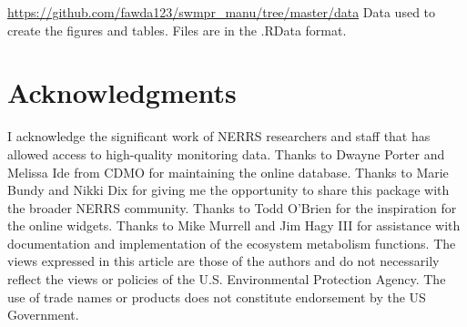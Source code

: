 \documentclass[10pt,letterpaper]{article}\usepackage[]{graphicx}\usepackage[]{color}
\begin{document}
\href{https://github.com/fawda123/swmpr_manu/tree/master/data}{https://github.com/fawda123/swmpr\_manu/tree/master/data} Data used to create the figures and tables.  Files are in the .RData format.

\section*{Acknowledgments}

I acknowledge the significant work of \gls{NERRS} researchers and staff that has allowed access to high-quality monitoring data.  Thanks to Dwayne Porter and Melissa Ide from \gls{CDMO} for maintaining the online database.  Thanks to Marie Bundy and Nikki Dix for giving me the opportunity to share this package with the broader \gls{NERRS} community.  Thanks to Todd O'Brien for the inspiration for the online widgets. Thanks to Mike Murrell and Jim Hagy III for assistance with documentation and implementation of the ecosystem metabolism functions. The views expressed in this article are those of the authors and do not necessarily reflect the views or policies of the U.S. Environmental Protection Agency.  The use of trade names or products does not constitute endorsement by the US Government.   

\nolinenumbers


\end{document}
